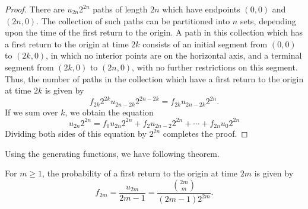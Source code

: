 \begin{proof}
There are $u_{2n}2^{2n}$ paths of length $2n$ which have endpoints $(0, 0)$ and $(2n, 0)$. The collection of such paths can be partitioned into $n$ sets, depending upon the time of the first return to the origin. A path in this collection which has a first return to the origin at time $2k$ consists of an initial segment from $(0, 0)$ to $(2k, 0)$, in which no interior points are on the horizontal axis, and a terminal segment from $(2k, 0)$
to $(2n, 0)$, with no further restrictions on this segment. Thus, the number of paths in the collection which have a first return to the origin at time $2k$ is given by
\begin{equation*}
    f_{2 k} 2^{2 k} u_{2 n-2 k} 2^{2 n-2 k}=f_{2 k} u_{2 n-2 k} 2^{2 n}.
\end{equation*}
If we sum over $k$, we obtain the equation
\begin{equation*}
    u_{2 n} 2^{2 n}=f_{0} u_{2 n} 2^{2 n}+f_{2} u_{2 n-2} 2^{2 n}+\cdots+f_{2 n} u_{0} 2^{2 n}
\end{equation*}
Dividing both sides of this equation by $2^{2n}$ completes the proof.
\end{proof}

Using the generating functions, we have following theorem.
\begin{theorem}
For $m \geq 1$, the probability of a first return to the origin at time
$2m$ is given by
\begin{equation*}
    f_{2 m}=\frac{u_{2 m}}{2 m-1}=\frac{\binom{2m}{m}}{(2 m-1) 2^{2 m}}.
\end{equation*}
\end{theorem}

